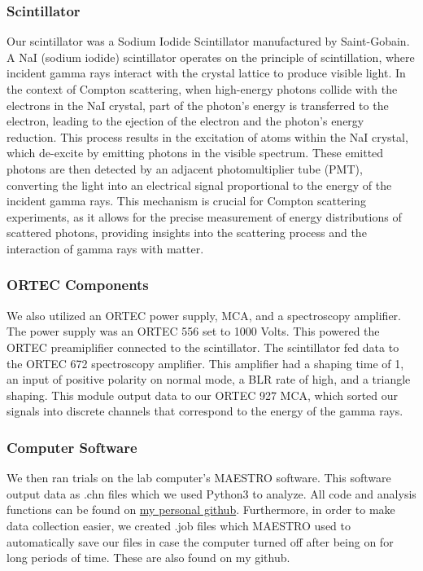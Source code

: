 \documentclass[10pt,letterpaper,onecolumn]{article}
\begin{document}
\subsubsection*{Scintillator}
Our scintillator was a Sodium Iodide Scintillator manufactured by Saint-Gobain. A NaI (sodium iodide) scintillator operates on the principle of scintillation, where incident gamma rays interact with the crystal lattice to produce visible light. In the context of Compton scattering, when high-energy photons collide with the electrons in the NaI crystal, part of the photon's energy is transferred to the electron, leading to the ejection of the electron and the photon's energy reduction. This process results in the excitation of atoms within the NaI crystal, which de-excite by emitting photons in the visible spectrum. These emitted photons are then detected by an adjacent photomultiplier tube (PMT), converting the light into an electrical signal proportional to the energy of the incident gamma rays. This mechanism is crucial for Compton scattering experiments, as it allows for the precise measurement of energy distributions of scattered photons, providing insights into the scattering process and the interaction of gamma rays with matter.
\subsubsection*{ORTEC Components}
We also utilized an ORTEC power supply, MCA, and a spectroscopy amplifier. The power supply was an ORTEC 556 set to 1000 Volts. This powered the ORTEC preamiplifier connected to the scintillator. The scintillator fed data to the ORTEC 672 spectroscopy amplifier. This amplifier had a shaping time of 1, an input of positive polarity on normal mode, a BLR rate of high, and a triangle shaping. This module output data to our ORTEC 927 MCA, which sorted our signals into discrete channels that correspond to the energy of the gamma rays.
\subsubsection*{Computer Software}
We then ran trials on the lab computer's MAESTRO software. This software output data as .chn files which we used Python3 to analyze. All code and analysis functions can be found on \href{https://github.com/adeshpande03/seniorlab}{my personal github}. Furthermore, in order to make data collection easier, we created .job files which MAESTRO used to automatically save our files in case the computer turned off after being on for long periods of time. These are also found on my github.
\end{document}

